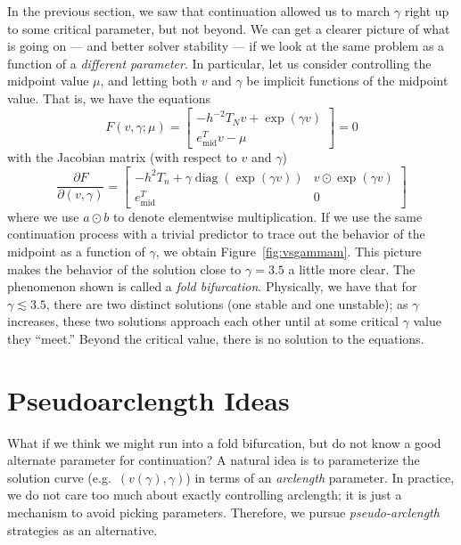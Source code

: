 \documentclass[12pt, leqno]{article} %
\begin{document}
In the previous section, we saw that continuation allowed us to march
$\gamma$ right up to some critical parameter, but not beyond.
We can get a clearer picture of what is going on --- and better solver
stability --- if we look at the same problem as a function of a
{\em different parameter}.  In particular, let us consider
controlling the midpoint value $\mu$, and letting both $v$
and $\gamma$ be implicit functions of the midpoint value.  That is,
we have the equations
\[
F(v,\gamma; \mu) =
\begin{bmatrix}
  -h^{-2} T_N v + \exp(\gamma v) \\
  e_{\mathrm{mid}}^T v - \mu
\end{bmatrix} = 0
\]
with the Jacobian matrix (with respect to $v$ and $\gamma$)
\[
\frac{\partial F}{\partial (v,\gamma)} =
\begin{bmatrix}
  -h^2 T_n + \gamma \operatorname{diag}(\exp(\gamma v)) &
  v \odot \exp(\gamma v) \\
  e_{\mathrm{mid}}^T & 0
\end{bmatrix}
\]
where we use $a \odot b$ to denote elementwise multiplication.
If we use the same continuation process with a trivial predictor
to trace out the behavior of the midpoint as a function of $\gamma$,
we obtain Figure~\ref{fig:vsgammam}.  This picture makes the behavior
of the solution close to $\gamma = 3.5$ a little more clear.  The
phenomenon shown is called a {\em fold bifurcation}.  Physically,
we have that for $\gamma \lesssim 3.5$, there are two distinct
solutions (one stable and one unstable); as $\gamma$ increases, these
two solutions approach each other until at some critical $\gamma$
value they ``meet.''  Beyond the critical value, there is no solution
to the equations.

\section*{Pseudoarclength Ideas}

What if we think we might run into a fold bifurcation, but do not
know a good alternate parameter for continuation?  A natural idea
is to parameterize the solution curve (e.g.~$(v(\gamma),\gamma)$)
in terms of an {\em arclength} parameter.  In practice, we do not
care too much about exactly controlling arclength; it is just a
mechanism to avoid picking parameters.  Therefore, we pursue
{\em pseudo-arclength} strategies as an alternative.
\end{document}
